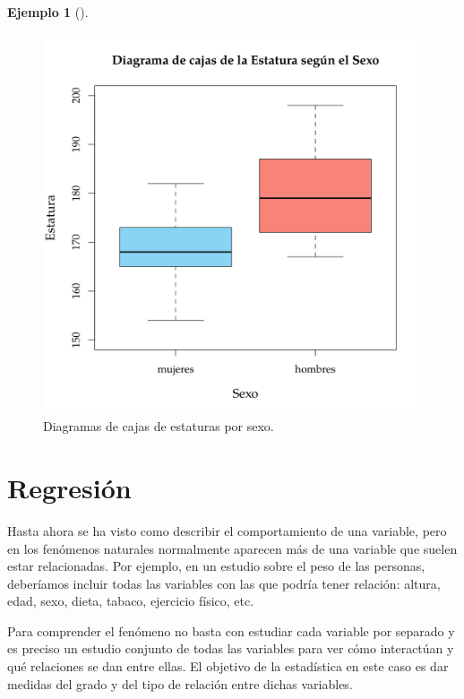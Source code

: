 \documentclass[
  a4paper,
]{scrreport}
\theoremstyle{plain}
\theoremstyle{definition}
\newtheorem{example}{Ejemplo}[chapter]
\theoremstyle{definition}
\theoremstyle{remark}
\begin{document}
\begin{example}[]
\begin{figure}[H]
{\centering \includegraphics{img/descriptiva/diagrama_caja_estatura_sexo.png}

}

\caption{Diagramas de cajas de estaturas por sexo.}

\end{figure}%

\end{example}


\chapter{Regresión}\label{regresiuxf3n}

Hasta ahora se ha visto como describir el comportamiento de una
variable, pero en los fenómenos naturales normalmente aparecen más de
una variable que suelen estar relacionadas. Por ejemplo, en un estudio
sobre el peso de las personas, deberíamos incluir todas las variables
con las que podría tener relación: altura, edad, sexo, dieta, tabaco,
ejercicio físico, etc.

Para comprender el fenómeno no basta con estudiar cada variable por
separado y es preciso un estudio conjunto de todas las variables para
ver cómo interactúan y qué relaciones se dan entre ellas. El objetivo de
la estadística en este caso es dar medidas del grado y del tipo de
relación entre dichas variables.
\end{document}

